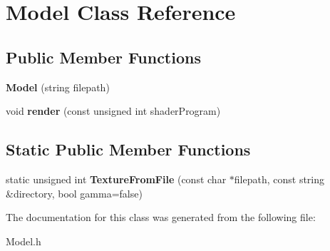 \hypertarget{class_model}{}\section{Model Class Reference}
\label{class_model}
\subsection*{Public Member Functions}
\begin{DoxyCompactItemize}
\item 
\mbox{\label{class_model_a4a90abd11a1c4e47f1b704e28e147dfb}} 
{\bfseries Model} (string filepath)
\item 
\mbox{\label{class_model_a0885da76930d0f3b919eaa10ae08e8ab}} 
void {\bfseries render} (const unsigned int shader\+Program)
\end{DoxyCompactItemize}
\subsection*{Static Public Member Functions}
\begin{DoxyCompactItemize}
\item 
\mbox{\label{class_model_a16c263d87f6368d21d5ab255468c2c90}} 
static unsigned int {\bfseries Texture\+From\+File} (const char $\ast$filepath, const string \&directory, bool gamma=false)
\end{DoxyCompactItemize}


The documentation for this class was generated from the following file\+:\begin{DoxyCompactItemize}
\item 
Model.\+h\end{DoxyCompactItemize}
